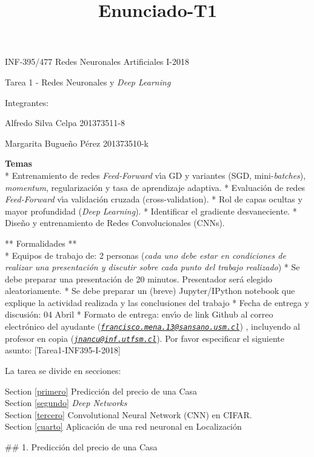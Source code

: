 \documentclass[11pt]{article}
\title{Enunciado-T1}
\begin{document}
    
    
    \maketitle
    
    

    
    INF-395/477 Redes Neuronales Artificiales I-2018

Tarea 1 - Redes Neuronales y \emph{Deep Learning}

Integrantes:

Alfredo Silva Celpa 201373511-8

Margarita Bugueño Pérez 201373510-k

\textbf{Temas}\\
* Entrenamiento de redes \emph{Feed-Forward} vı́a GD y variantes (SGD,
mini-\emph{batches}), \emph{momentum}, regularización y tasa de
aprendizaje adaptiva. * Evaluación de redes \emph{Feed-Forward} vı́a
validación cruzada (cross-validation). * Rol de capas ocultas y mayor
profundidad (\emph{Deep Learning}). * Identificar el gradiente
desvaneciente. * Diseño y entrenamiento de Redes Convolucionales (CNNs).

** Formalidades **\\
* Equipos de trabajo de: 2 personas (\emph{cada uno debe estar en
condiciones de realizar una presentación y discutir sobre cada punto del
trabajo realizado}) * Se debe preparar una presentación de 20 minutos.
Presentador será elegido aleatoriamente. * Se debe preparar un (breve)
Jupyter/IPython notebook que explique la actividad realizada y las
conclusiones del trabajo * Fecha de entrega y discusión: 04 Abril *
Formato de entrega: envı́o de link Github al correo electrónico del
ayudante
(\emph{\href{mailto:francisco.mena.13@sansano.usm.cl}{\nolinkurl{francisco.mena.13@sansano.usm.cl}}})
, incluyendo al profesor en copia
(\emph{\href{mailto:jnancu@inf.utfsm.cl}{\nolinkurl{jnancu@inf.utfsm.cl}}}).
Por favor especificar el siguiente asunto: {[}Tarea1-INF395-I-2018{]}

La tarea se divide en secciones:

Section \ref{primero} Predicción del precio de una Casa\\
Section \ref{segundo} \emph{Deep Networks}\\
Section \ref{tercero} Convolutional Neural Network (CNN) en CIFAR.\\
Section \ref{cuarto} Aplicación de una red neuronal en Localización

     \#\# 1. Predicción del precio de una Casa
\end{document}
